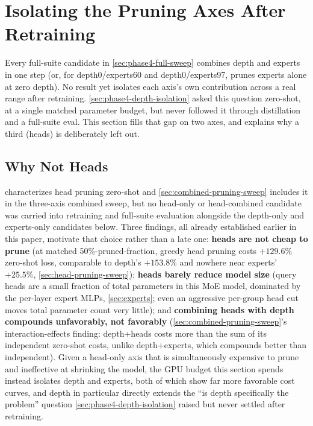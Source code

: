 \documentclass{article}
\theoremstyle{plain}
\theoremstyle{definition}
\theoremstyle{remark}
\begin{document}
\section{Isolating the Pruning Axes After Retraining}
\label{sec:pure-axis}

Every full-suite candidate in \cref{sec:phase4-full-sweep} combines
depth and experts in one step (or, for depth0/experts60 and
depth0/experts97, prunes experts alone at zero depth). No result yet
isolates each axis's own contribution across a real range after
retraining. \cref{sec:phase4-depth-isolation} asked this question
zero-shot, at a single matched parameter budget, but never followed it
through distillation and a full-suite eval. This section fills that gap
on two axes, and explains why a third (heads) is deliberately left
out.

\subsection{Why Not Heads}
\label{sec:pure-axis-no-heads}

 characterizes head pruning zero-shot and
\cref{sec:combined-pruning-sweep} includes it in the three-axis combined
sweep, but no head-only or head-combined candidate was carried into
retraining and full-suite evaluation alongside the depth-only and
experts-only candidates below. Three findings, all already established
earlier in this paper, motivate that choice rather than a late one:
\textbf{heads are not cheap to prune} (at matched 50\%-pruned-fraction,
greedy head pruning costs $+129.6\%$ zero-shot loss, comparable to
depth's $+153.8\%$ and nowhere near experts' $+25.5\%$,
\cref{sec:head-pruning-sweep}); \textbf{heads barely reduce model size}
(query heads are a small fraction of total parameters in this MoE model,
dominated by the per-layer expert MLPs, \cref{sec:experts};
even an aggressive per-group head cut moves total parameter count very
little); and \textbf{combining heads with depth compounds unfavorably,
not favorably} (\cref{sec:combined-pruning-sweep}'s interaction-effects
finding: depth+heads costs more than the sum of its independent
zero-shot costs, unlike depth+experts, which compounds better than
independent). Given a head-only axis that is simultaneously expensive to
prune and ineffective at shrinking the model, the GPU budget this section
spends instead isolates depth and experts, both of which show far more
favorable cost curves, and depth in particular directly extends the
``is depth specifically the problem'' question
\cref{sec:phase4-depth-isolation} raised but never settled after
retraining.
\end{document}
